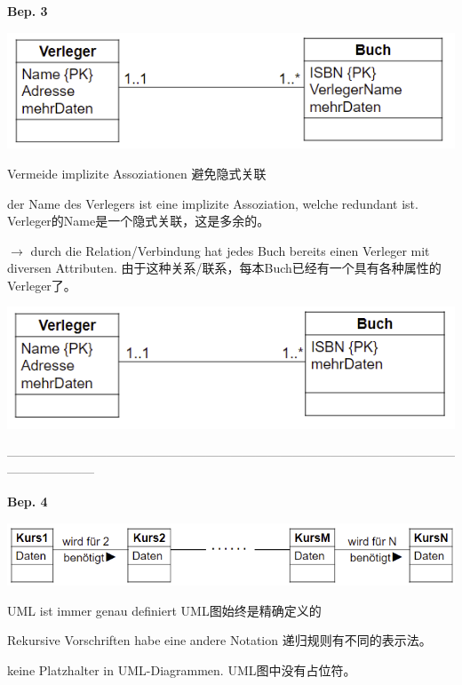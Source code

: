 \documentclass[fleqn]{article}
\begin{document}
\noindent\textbf{Bep. 3}

\begin{center} 
    \includegraphics[scale=0.5]{11.png}
\end{center}

Vermeide implizite Assoziationen 避免隐式关联

der Name des Verlegers ist eine implizite Assoziation, welche redundant ist. Verleger的Name是一个隐式关联，这是多余的。

$\rightarrow$ durch die Relation/Verbindung hat jedes Buch bereits einen Verleger mit diversen Attributen.
由于这种关系/联系，每本Buch已经有一个具有各种属性的Verleger了。

\begin{center} 
    \includegraphics[scale=0.5]{12.png}
\end{center}

\noindent---------------------------------------------------------------------------------------------------------------------------------

\noindent\textbf{Bep. 4}

\begin{center} 
    \includegraphics[scale=0.5]{13.png}
\end{center}

UML ist immer genau definiert UML图始终是精确定义的

Rekursive Vorschriften habe eine andere Notation 递归规则有不同的表示法。

keine Platzhalter in UML-Diagrammen. UML图中没有占位符。
\end{document}
